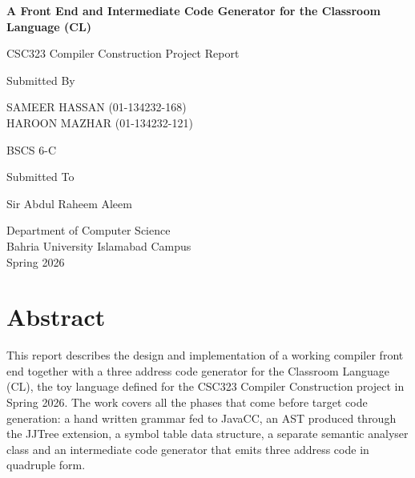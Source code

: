 \documentclass[12pt,a4paper]{report}
\begin{document}
\begin{titlepage}
\begin{center}

\vspace*{1cm}

{\Huge \textbf{A Front End and Intermediate Code Generator for the Classroom Language (CL)}}

\vspace{1cm}

{\Large CSC323 Compiler Construction Project Report}

\vspace{1cm}

Submitted By

\vspace{0.5cm}

SAMEER HASSAN (01-134232-168) \\
HAROON MAZHAR (01-134232-121)

\vspace{1cm}

BSCS 6-C

\vspace{0.5cm}

Submitted To

\vspace{0.5cm}

Sir Abdul Raheem Aleem

\vfill

Department of Computer Science \\
Bahria University Islamabad Campus \\
Spring 2026

\end{center}
\end{titlepage}

\chapter*{Abstract}

This report describes the design and implementation of a working compiler front end together with a three address code generator for the Classroom Language (CL), the toy language defined for the CSC323 Compiler Construction project in Spring 2026. The work covers all the phases that come before target code generation: a hand written grammar fed to JavaCC, an AST produced through the JJTree extension, a symbol table data structure, a separate semantic analyser class and an intermediate code generator that emits three address code in quadruple form.
\end{document}
